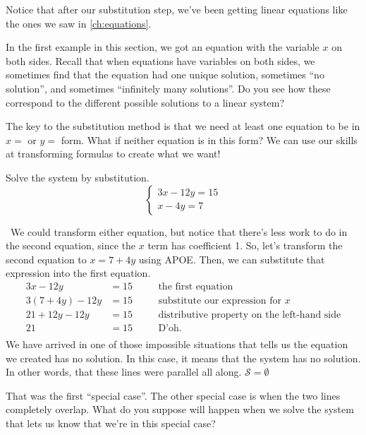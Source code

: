 Notice that after our substitution step, we've been getting linear equations like the ones we saw in \cref{ch:equations}.

In the first example in this section, we got an equation with the variable $x$ on both sides. Recall that when equations have variables on both sides, we sometimes find that the equation had one unique solution, sometimes ``no solution'', and sometimes ``infinitely many solutions''. Do you see how these correspond to the different possible solutions to a linear system?

The key to the substitution method is that we need at least one equation to be in $x=$ or $y=$ form. What if neither equation is in this form? We can use our skills at transforming formulas to create what we want!

\begin{boxedex}
Solve the system by substitution.
\[
\left\{%
\begin{array}{l}
3x-12y=15\\
x-4y=7
\end{array}
\right.
\] 

\exsoln\ We could transform either equation, but notice that there's less work to do in the second equation, since the $x$ term has coefficient 1. So, let's transform the second equation to $x=7+4y$ using APOE. Then, we can substitute that expression into the first equation.
\[\begin{aligned}
3x-12y &= 15
&& \quad\text{the first equation}\\
3(7+4y)-12y &= 15
&& \quad\text{substitute our expression for $x$}\\
21+12y-12y &= 15
&& \quad\text{distributive property on the left-hand side}\\
21 &= 15
&& \quad\text{D'oh.}\\
\end{aligned}\]
We have arrived in one of those impossible situations that tells us the equation we created has no solution. In this case, it means that the system has no solution. In other words, that these lines were parallel all along. $\mathcal{S}=\emptyset$
\end{boxedex}

That was the first ``special case''. The other special case is when the two lines completely overlap. What do you suppose will happen when we solve the system that lets us know that we're in this special case?

